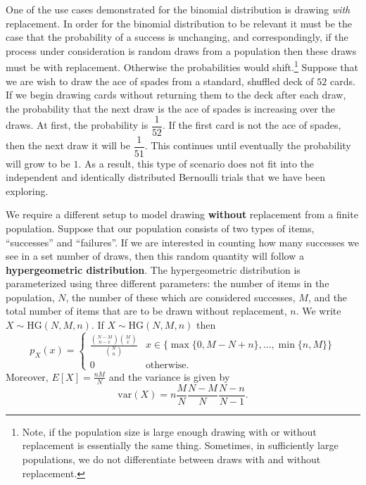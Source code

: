 \documentclass[
  letterpaper,
  DIV=11,
  numbers=noendperiod]{scrreprt}
\theoremstyle{definition}
\theoremstyle{definition}
\theoremstyle{definition}
\theoremstyle{remark}
\begin{document}
One of the use cases demonstrated for the binomial distribution is
drawing \emph{with} replacement. In order for the binomial distribution
to be relevant it must be the case that the probability of a success is
unchanging, and correspondingly, if the process under consideration is
random draws from a population then these draws must be with
replacement. Otherwise the probabilities would shift.\footnote{Note, if
  the population size is large enough drawing with or without
  replacement is essentially the same thing. Sometimes, in sufficiently
  large populations, we do not differentiate between draws with and
  without replacement.} Suppose that we are wish to draw the ace of
spades from a standard, shuffled deck of \(52\) cards. If we begin
drawing cards without returning them to the deck after each draw, the
probability that the next draw is the ace of spades is increasing over
the draws. At first, the probability is \(\dfrac{1}{52}\). If the first
card is not the ace of spades, then the next draw it will be
\(\dfrac{1}{51}\). This continues until eventually the probability will
grow to be \(1\). As a result, this type of scenario does not fit into
the independent and identically distributed Bernoulli trials that we
have been exploring.

We require a different setup to model drawing \textbf{without}
replacement from a finite population. Suppose that our population
consists of two types of items, ``successes'' and ``failures''. If we
are interested in counting how many successes we see in a set number of
draws, then this random quantity will follow a \textbf{hypergeometric
distribution}. The hypergeometric distribution is parameterized using
three different parameters: the number of items in the population,
\(N\), the number of these which are considered successes, \(M\), and
the total number of items that are to be drawn without replacement,
\(n\). We write \(X\sim\text{HG}(N,M,n)\). If \(X\sim\text{HG}(N,M,n)\)
then
\[p_X(x) = \begin{cases}\frac{\binom{N-M}{n-x}\binom{M}{x}}{\binom{N}{n}} & x\in\{\max\{0,M-N+n\},\dots,\min\{n,M\}\} \\ 0 &\text{otherwise}.\end{cases}\]
Moreover, \(E[X] = \frac{nM}{N}\) and the variance is given by
\[\text{var}(X) = n\frac{M}{N}\frac{N-M}{N}\frac{N-n}{N-1}.\]
\end{document}

